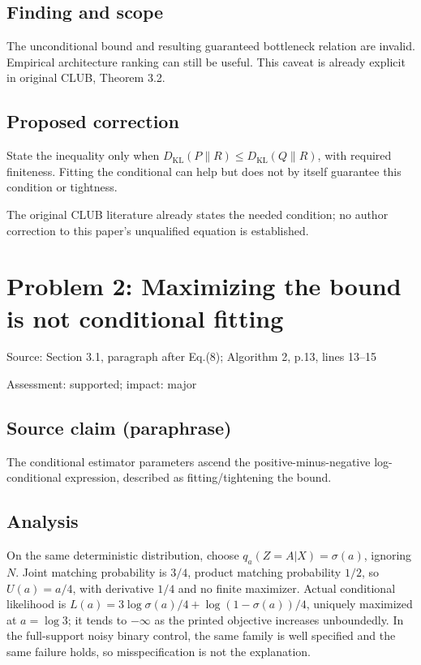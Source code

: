 \documentclass[11pt]{article}
\begin{document}
\subsection*{Finding and scope}

The unconditional bound and resulting guaranteed bottleneck relation are invalid. Empirical architecture ranking can still be useful. This caveat is already explicit in original CLUB, Theorem 3.2.

\subsection*{Proposed correction}

State the inequality only when \(D_{\mathrm{KL}}(P\|R)\le D_{\mathrm{KL}}(Q\|R)\), with required finiteness. Fitting the conditional can help but does not by itself guarantee this condition or tightness.

The original CLUB literature already states the needed condition; no author correction to this paper’s unqualified equation is established.

\section*{Problem 2: Maximizing the bound is not conditional fitting}

Source: Section 3.1, paragraph after Eq.(8); Algorithm 2, p.13, lines 13–15

Assessment: supported; impact: major

\subsection*{Source claim (paraphrase)}

The conditional estimator parameters ascend the positive-minus-negative log-conditional expression, described as fitting/tightening the bound.

\subsection*{Analysis}

On the same deterministic distribution, choose \(q_a(Z=A|X)=\sigma(a)\), ignoring \(N\). Joint matching probability is \(3/4\), product matching probability \(1/2\), so \(U(a)=a/4\), with derivative \(1/4\) and no finite maximizer. Actual conditional likelihood is \(L(a)=3\log\sigma(a)/4+\log(1-\sigma(a))/4\), uniquely maximized at \(a=\log3\); it tends to \(-\infty\) as the printed objective increases unboundedly. In the full-support noisy binary control, the same family is well specified and the same failure holds, so misspecification is not the explanation.
\end{document}

